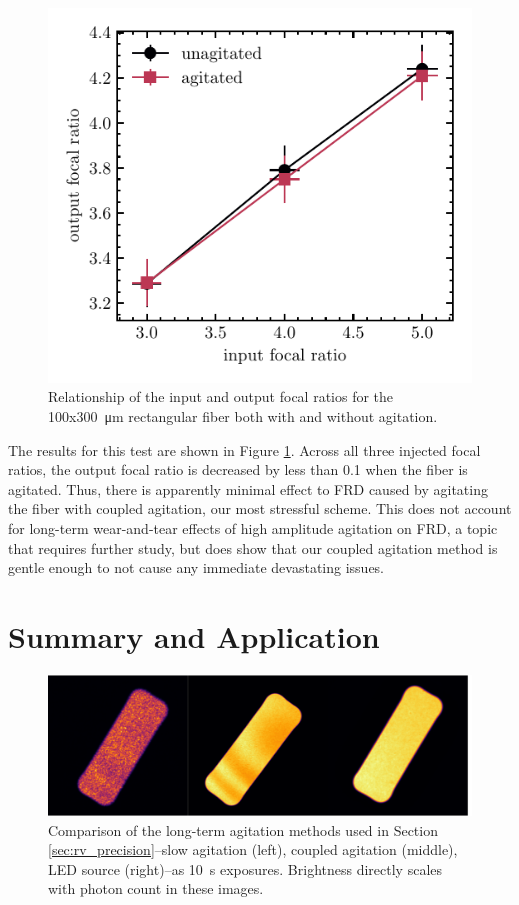 \documentclass[twocolumn]{emulateapj}
\begin{document}
\begin{figure}
\centering
	\includegraphics[width=\columnwidth]{images/frd_input_output.pdf}
	\caption{Relationship of the input and output focal ratios for the 100x\SI{300}{\micro\meter} rectangular fiber both with and without agitation.}
\label{fig:frd}
\end{figure}

The results for this test are shown in Figure \ref{fig:frd}. Across all three injected focal ratios, the output focal ratio is decreased by less than 0.1 when the fiber is agitated. Thus, there is apparently minimal effect to FRD caused by agitating the fiber with coupled agitation, our most stressful scheme. This does not account for long-term wear-and-tear effects of high amplitude agitation on FRD, a topic that requires further study, but does show that our coupled agitation method is gentle enough to not cause any immediate devastating issues.

\section{Summary and Application}
\label{sec:conclusions}

\begin{figure}
\centering
	\includegraphics[width=\columnwidth]{images/fiber_rv_error.pdf}
	\caption{Comparison of the long-term agitation methods used in Section \ref{sec:rv_precision}--slow agitation (left), coupled agitation (middle), LED source (right)--as \SI{10}{\second} exposures. Brightness directly scales with photon count in these images.}
\label{fig:fiber_rv_error}
\end{figure}
\end{document}
